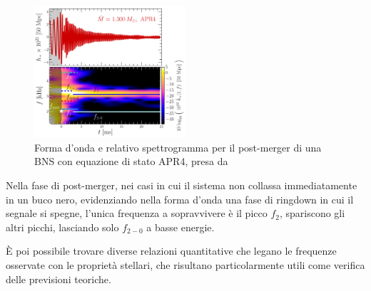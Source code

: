 \begin{figure}
	\vspace{-15pt}
	\begin{center}
		\includegraphics[width=0.5\textwidth]{figures/Capitolo_1/GW_spectrogram_APR4-q10-M1300.pdf}
	\end{center}
	\vspace{-10pt}
	\caption{Forma d'onda e relativo spettrogramma per il post-merger di una BNS con equazione di stato APR4, presa da \cite{Rezzolla_2016}}
	\label{fig:spettrogramma_postmerger_APR4}
	\vspace{-40pt}
\end{figure}

Nella fase di post-merger, nei casi in cui il sistema non collassa immediatamente in un buco nero, evidenziando nella forma d'onda una fase di ringdown in cui il segnale si spegne, l'unica frequenza a sopravvivere è il picco $f_2$, spariscono gli altri picchi, lasciando solo $f_{2-0}$ a basse energie.

È poi possibile trovare diverse relazioni quantitative che legano le frequenze osservate con le proprietà stellari, che risultano particolarmente utili come verifica delle previsioni teoriche.

